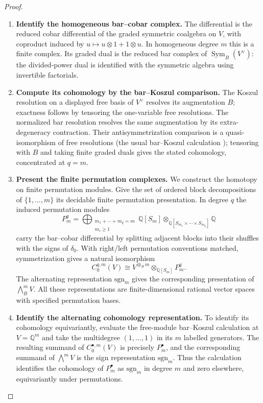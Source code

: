 \documentclass[11pt,a4paper]{article}
\numberwithin{algorithm}{section}
\numberwithin{equation}{section}
\theoremstyle{definition}
\theoremstyle{remark}
\theoremstyle{plain}
\newcommand{\QQ}{\mathbb Q}
\newcommand{\Sym}{\operatorname{Sym}}
\theoremstyle{definition}
\theoremstyle{plain}
\begin{document}
\begin{proof}\leavevmode
\begin{enumerate}[leftmargin=*,align=left]
\item \textbf{Identify the homogeneous bar--cobar complex.}
The differential is the reduced cobar differential of the graded
symmetric coalgebra on $V$, with coproduct induced by
$u\mapsto u\otimes1+1\otimes u$.  In homogeneous degree $m$ this
is a finite complex.  Its graded dual is the reduced bar complex
of $\Sym_B(V^\vee)$: the divided-power dual is identified with
the symmetric algebra using invertible factorials.

\item \textbf{Compute its cohomology by the bar--Koszul comparison.}
The Koszul
resolution on a displayed free basis of $V^\vee$ resolves its
augmentation $B$; exactness follows by tensoring the one-variable
free resolutions.  The normalized bar resolution resolves the
same augmentation by its extra-degeneracy contraction.  Their
antisymmetrization comparison is a quasi-isomorphism of free
resolutions (the usual bar--Koszul calculation \citep{HKR});
tensoring with $B$ and taking finite graded duals gives the
stated cohomology, concentrated at $q=m$.

\item \textbf{Present the finite permutation complexes.}
We construct the homotopy on finite permutation modules.  Give the set of ordered block
decompositions of $\{1,\ldots,m\}$ its decidable finite
permutation presentation.  In degree $q$ the induced permutation
modules
\[
 P_m^q=\bigoplus_{\substack{m_1+\cdots+m_q=m\\m_i\ge1}}
 \QQ[S_m]\otimes_{\QQ[S_{m_1}\times\cdots\times S_{m_q}]}\QQ
\]
carry the bar--cobar differential by splitting adjacent blocks
into their shuffles with the signs of $\delta_0$.  With right/left
permutation conventions matched, symmetrization gives a natural
isomorphism
\[
 C^{q,m}_0(V)\cong
 V^{\otimes_Bm}\otimes_{\QQ[S_m]}P_m^q.
\]
The alternating representation $\mathrm{sgn}_m$ gives the
corresponding presentation of $\bigwedge_B^mV$.
All these representations are finite-dimensional rational vector
spaces with specified permutation bases.

\item \textbf{Identify the alternating cohomology representation.}
To identify its cohomology equivariantly, evaluate the free-module
bar--Koszul calculation at $V=\QQ^m$ and take the multidegree
$(1,\ldots,1)$ in its $m$ labelled generators.  The resulting
summand of $C^{\bullet,m}_0(V)$ is precisely $P_m^\bullet$,
and the corresponding summand of $\bigwedge^mV$ is the sign
representation $\mathrm{sgn}_m$.  Thus the calculation identifies
the cohomology of $P_m^\bullet$ as $\mathrm{sgn}_m$ in degree
$m$ and zero elsewhere, equivariantly under permutations.


\end{enumerate}
\end{proof}
\end{document}
